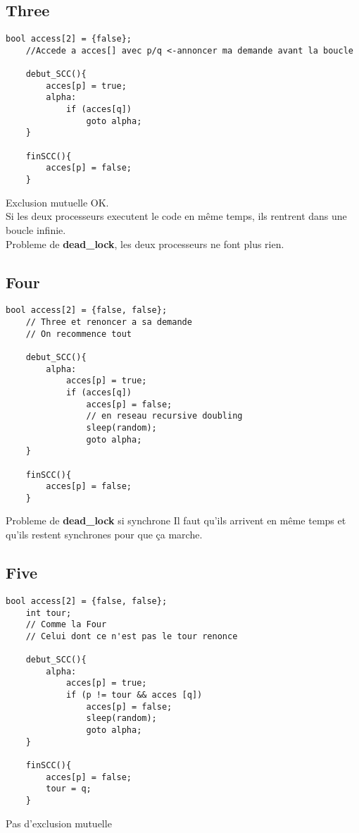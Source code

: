 \documentclass[11pt]{article}
\begin{document}
\pagebreak

\subsection{Three}
\begin{lstlisting}[frame=single]
	bool access[2] = {false};
	//Accede a acces[] avec p/q <-annoncer ma demande avant la boucle 

	debut_SCC(){
		acces[p] = true;
		alpha:
			if (acces[q])
				goto alpha;
	}

	finSCC(){
		acces[p] = false;
	}
\end{lstlisting}
Exclusion mutuelle OK.\\
Si les deux processeurs executent le code en même temps, ils rentrent dans une boucle infinie.\\
Probleme de \textbf{dead\_lock}, les deux processeurs ne font plus rien.

\subsection{Four}
\begin{lstlisting}[frame=single]
	bool access[2] = {false, false};
	// Three et renoncer a sa demande
	// On recommence tout

	debut_SCC(){
		alpha:
			acces[p] = true;
			if (acces[q])
				acces[p] = false;
				// en reseau recursive doubling
				sleep(random); 
				goto alpha;
	}

	finSCC(){
		acces[p] = false;
	}
\end{lstlisting}
Probleme de \textbf{dead\_lock} si synchrone
Il faut qu'ils arrivent en même temps et qu'ils restent synchrones pour que ça marche.

\pagebreak

\subsection{Five}

\begin{lstlisting}[frame=single]
	bool access[2] = {false, false};
	int tour;
	// Comme la Four
	// Celui dont ce n'est pas le tour renonce

	debut_SCC(){
		alpha:
			acces[p] = true;
			if (p != tour && acces [q])
				acces[p] = false;
				sleep(random); 
				goto alpha;
	}

	finSCC(){
		acces[p] = false;
		tour = q;
	}
\end{lstlisting}
Pas d'exclusion mutuelle
\end{document}
